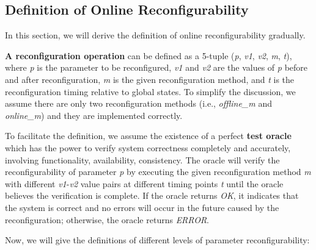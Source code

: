 


\subsection{Definition of Online Reconfigurability}
In this section, we will derive the definition of online reconfigurability gradually. 

\textbf{A reconfiguration operation} can be defined as a 5-tuple (\textit{p}, \textit{v1}, \textit{v2}, \textit{m}, \textit{t}), where
\textit{p} is the parameter to be reconfigured, \textit{v1} and \textit{v2} are the values of \textit{p} before and after reconfiguration, \textit{m} is the given reconfiguration method, and \textit{t} is the reconfiguration timing relative to global states. To simplify the discussion, we assume there are only two reconfiguration methods (i.e., \textit{offline\_m} and \textit{online\_m}) and they are implemented correctly.

To facilitate the definition, we assume the existence of a perfect \textbf{test oracle} which has the power to verify system correctness completely and accurately, involving functionality, availability, consistency. The oracle will verify the reconfigurability of parameter \textit{p} by executing the given reconfiguration method \textit{m} with different \textit{v1}-\textit{v2} value pairs at different timing points \textit{t} until the oracle believes the verification is complete. If the oracle returns \textit{OK}, it indicates that the system is correct and no errors will occur in the future caused by the reconfiguration; otherwise, the oracle returns \textit{ERROR}.

Now, we will give the definitions of different levels of parameter reconfigurability:

